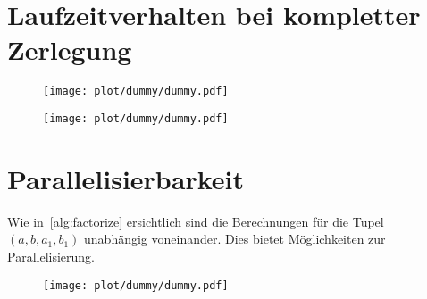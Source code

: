 \section{Laufzeitverhalten bei kompletter Zerlegung}
\begin{figure}[ht]
		\centering
		\texttt{[image: plot/dummy/dummy.pdf]}
\end{figure}
\begin{figure}[ht]
		\centering
		\texttt{[image: plot/dummy/dummy.pdf]}
\end{figure}

\section{Parallelisierbarkeit}\label{sec:parallel}
Wie in~\ref{alg:factorize} ersichtlich sind die Berechnungen für die Tupel $\left(a, b, a_1, b_1\right)$ unabhängig voneinander. Dies bietet Möglichkeiten zur Parallelisierung.
\begin{figure}[ht]
		\centering
		\texttt{[image: plot/dummy/dummy.pdf]}
\end{figure}
